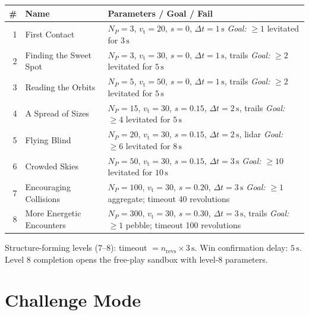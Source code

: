 \documentclass[12pt, a4paper]{article}
\newcommand{\vt}{v_{\mathrm{t}}}
\begin{document}
\begin{longtable}{@{}rp{5cm}p{9cm}@{}}
  \toprule
  \# & Name & Parameters / Goal / Fail \\
  \midrule
  1 & First Contact &
    $N_P=3$, $\vt=20$, $s=0$, $\Delta t=1\,\mathrm{s}$ \newline
    \textit{Goal:} $\geq 1$ levitated for $3\,\mathrm{s}$ \\[4pt]
  2 & Finding the Sweet Spot &
    $N_P=3$, $\vt=30$, $s=0$, $\Delta t=1\,\mathrm{s}$, trails \newline
    \textit{Goal:} $\geq 2$ levitated for $5\,\mathrm{s}$ \\[4pt]
  3 & Reading the Orbits &
    $N_P=5$, $\vt=50$, $s=0$, $\Delta t=1\,\mathrm{s}$, trails \newline
    \textit{Goal:} $\geq 2$ levitated for $5\,\mathrm{s}$ \\[4pt]
  4 & A Spread of Sizes &
    $N_P=15$, $\vt=30$, $s=0.15$, $\Delta t=2\,\mathrm{s}$, trails \newline
    \textit{Goal:} $\geq 4$ levitated for $5\,\mathrm{s}$ \\[4pt]
  5 & Flying Blind &
    $N_P=20$, $\vt=30$, $s=0.15$, $\Delta t=2\,\mathrm{s}$, lidar \newline
    \textit{Goal:} $\geq 6$ levitated for $8\,\mathrm{s}$ \\[4pt]
  6 & Crowded Skies &
    $N_P=50$, $\vt=30$, $s=0.15$, $\Delta t=3\,\mathrm{s}$ \newline
    \textit{Goal:} $\geq 10$ levitated for $10\,\mathrm{s}$ \\[4pt]
  7 & Encouraging Collisions &
    $N_P=100$, $\vt=30$, $s=0.20$, $\Delta t=3\,\mathrm{s}$ \newline
    \textit{Goal:} $\geq 1$ aggregate; timeout 40 revolutions \\[4pt]
  8 & More Energetic Encounters &
    $N_P=300$, $\vt=30$, $s=0.30$, $\Delta t=3\,\mathrm{s}$, trails \newline
    \textit{Goal:} $\geq 1$ pebble; timeout 100 revolutions \\
  \bottomrule
\end{longtable}

Structure-forming levels (7--8): timeout $= n_{\mathrm{revs}} \times 3\,\mathrm{s}$.
Win confirmation delay: $5\,\mathrm{s}$.
Level 8 completion opens the free-play sandbox with level-8 parameters.

\section{Challenge Mode}
\label{sec:challenge}
\end{document}
